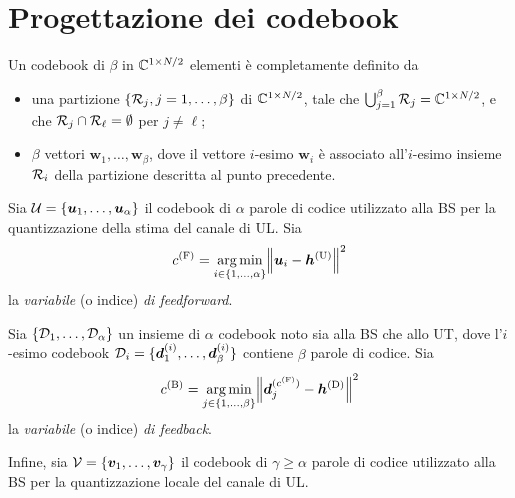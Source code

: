 \chapter{Progettazione dei codebook}
\label{app:codebook-design}

Un codebook di \(\beta\) in \(\mathbb{C}^{1 \times N/2}\) elementi è completamente
definito da
\begin{itemize}

    \item una partizione \(\{\mathcal{R}_j, j=1,\dots,\beta\}\) di
        \(\mathbb{C}^{1 \times N/2}\), tale che \(\bigcup_{j=1}^\beta \mathcal{R}_j = \mathbb{C}^{1
        \times N/2}\), e che \(\mathcal{R}_j \cap \mathcal{R}_\ell = \emptyset\) per
        \(j \neq \ell\);

    \item \(\beta\) vettori \(\bm{w}_1,\dots,\bm{w}_\beta\), dove il vettore
        \(i\)-esimo \(\bm{w}_i\) è associato all'\(i\)-esimo insieme
        \(\mathcal{R}_i\) della partizione descritta al punto precedente.

\end{itemize}

Sia \(\mathcal{U} = \{\bm{u}_1,\dots,\bm{u}_\alpha\}\) il codebook di \(\alpha\)
parole di codice utilizzato alla BS per la quantizzazione della stima del
canale di UL. Sia
\begin{equation}
    c^\mathrm{(F)} = \argmin_{i \in \{1,\dots,\alpha\}}
        \lnorm \bm{u}_i - \bm{h}^\mathrm{(U)} \rnorm^2
\end{equation}
la \textit{variabile} (o indice) \textit{di feedforward}.

Sia \(\{\mathcal{D}_1,\dots,\mathcal{D}_\alpha\}\) un insieme di \(\alpha\) codebook
noto sia alla BS che allo UT, dove l'\(i\)-esimo codebook \(\mathcal{D}_i =
\{\bm{d}_1^{(i)},\dots,\bm{d}_\beta^{(i)}\}\) contiene \(\beta\) parole di
codice. Sia
\begin{equation}
    c^\mathrm{(B)} = \argmin_{j \in \{1,\dots,\beta\}}
        \lnorm \bm{d}_j^{(c^\mathrm{(F)})} - \bm{h}^\mathrm{(D)} \rnorm^2
\end{equation}
la \textit{variabile} (o indice) \textit{di feedback}.

Infine, sia \(\mathcal{V} = \{\bm{v}_1,\dots,\bm{v}_\gamma\}\) il
codebook di \(\gamma \ge \alpha\) parole di codice utilizzato alla BS per la
quantizzazione locale del canale di UL.

